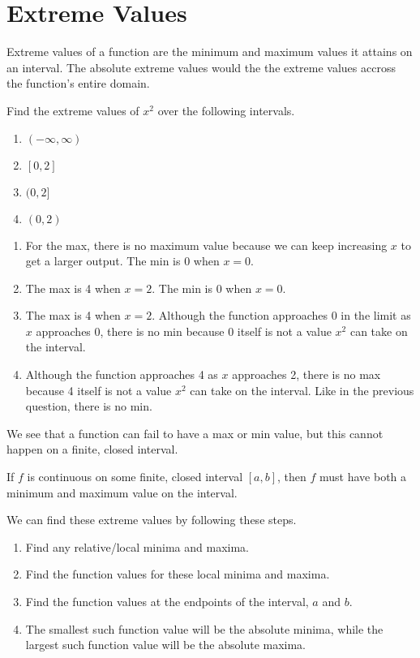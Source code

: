 \section{Extreme Values}
Extreme values of a function are the minimum and maximum values it attains on an interval.
The absolute extreme values would the the extreme values accross the function's entire domain.

\begin{example}
	Find the extreme values of $x^2$ over the following intervals.
	\begin{enumerate}
		\item $(-\infty, \infty)$
		\item $[0,2]$
		\item $(0,2]$
		\item $(0,2)$
	\end{enumerate}
\end{example}
\begin{enumerate}
	\item For the max, there is no maximum value because we can keep increasing $x$ to get a larger output.
		The min is 0 when $x=0$.
	\item The max is 4 when $x=2$.
		The min is 0 when $x=0$.
	\item The max is 4 when $x=2$.
		Although the function approaches 0 in the limit as $x$ approaches 0, there is no min because 0 itself is not a value $x^2$ can take on the interval.
	\item Although the function approaches 4 as $x$ approaches 2, there is no max because 4 itself is not a value $x^2$ can take on the interval.
		Like in the previous question, there is no min.
\end{enumerate}
We see that a function can fail to have a max or min value, but this cannot happen on a finite, closed interval.

\begin{theorem}
	If $f$ is continuous on some finite, closed interval $[a,b]$, then $f$ must have both a minimum and maximum value on the interval.
\end{theorem}

\noindent
We can find these extreme values by following these steps.
\begin{enumerate}
	\item Find any relative/local minima and maxima.
	\item Find the function values for these local minima and maxima.
	\item Find the function values at the endpoints of the interval, $a$ and $b$.
	\item The smallest such function value will be the absolute minima, while the largest such function value will be the absolute maxima.
\end{enumerate}

